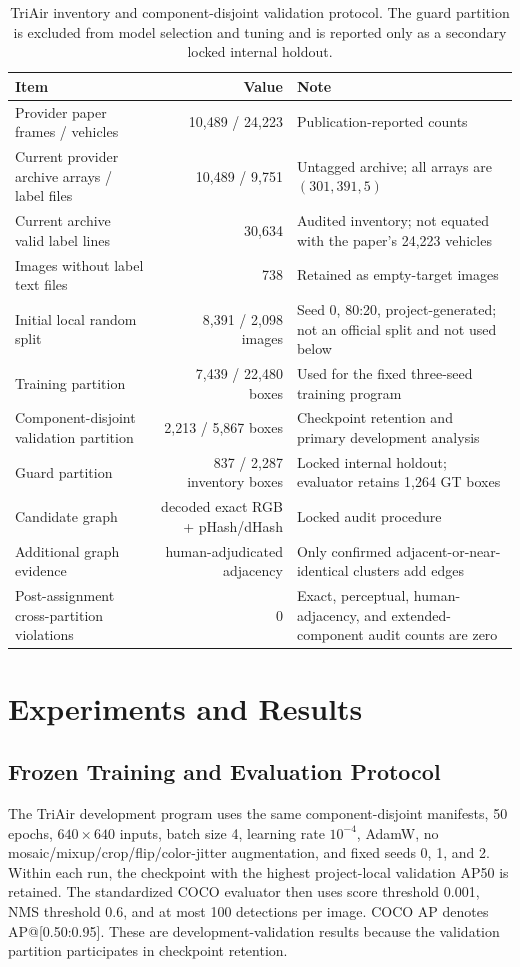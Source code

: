 \begin{table}[t]
\centering
\caption{TriAir inventory and component-disjoint validation protocol. The guard partition is excluded from model selection and tuning and is reported only as a secondary locked internal holdout.}
\label{tab:protocol}
\small
\begin{tabularx}{\textwidth}{@{}l r Y@{}}
\toprule
Item & Value & Note\\
\midrule
Provider paper frames / vehicles & 10,489 / 24,223 & Publication-reported counts \cite{iaboni2026trimodal}\\
Current provider archive arrays / label files & 10,489 / 9,751 & Untagged archive; all arrays are $(301,391,5)$ \\
Current archive valid label lines & 30,634 & Audited inventory; not equated with the paper's 24,223 vehicles\\
Images without label text files & 738 & Retained as empty-target images\\
Initial local random split & 8,391 / 2,098 images & Seed 0, 80:20, project-generated; not an official split and not used below\\
Training partition & 7,439 / 22,480 boxes & Used for the fixed three-seed training program\\
Component-disjoint validation partition & 2,213 / 5,867 boxes & Checkpoint retention and primary development analysis\\
Guard partition & 837 / 2,287 inventory boxes & Locked internal holdout; evaluator retains 1,264 GT boxes\\
Candidate graph & decoded exact RGB + pHash/dHash & Locked audit procedure\\
Additional graph evidence & human-adjudicated adjacency & Only confirmed adjacent-or-near-identical clusters add edges\\
Post-assignment cross-partition violations & 0 & Exact, perceptual, human-adjacency, and extended-component audit counts are zero\\
\bottomrule
\end{tabularx}
\end{table}

\section{Experiments and Results}
\subsection{Frozen Training and Evaluation Protocol}
The TriAir development program uses the same component-disjoint manifests, 50 epochs, $640\times640$ inputs, batch size 4, learning rate $10^{-4}$, AdamW, no mosaic/mixup/crop/flip/color-jitter augmentation, and fixed seeds 0, 1, and 2. Within each run, the checkpoint with the highest project-local validation AP50 is retained. The standardized COCO evaluator then uses score threshold 0.001, NMS threshold 0.6, and at most 100 detections per image. COCO AP denotes AP@[0.50:0.95]. These are development-validation results because the validation partition participates in checkpoint retention.

